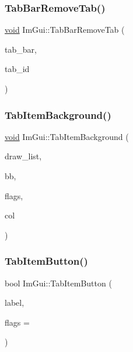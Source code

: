 \subsubsection{\texorpdfstring{Tab\+Bar\+Remove\+Tab()}{TabBarRemoveTab()}}
{\footnotesize\ttfamily \hyperlink{imgui__impl__opengl3__loader_8h_ac668e7cffd9e2e9cfee428b9b2f34fa7}{void} Im\+Gui\+::\+Tab\+Bar\+Remove\+Tab (\begin{DoxyParamCaption}\item[{\hyperlink{structImGuiTabBar}{Im\+Gui\+Tab\+Bar} $\ast$}]{tab\+\_\+bar,  }\item[{Im\+Gui\+ID}]{tab\+\_\+id }\end{DoxyParamCaption})}

\mbox{\label{namespaceImGui_a87fc45357f733cb2a378e098d2855243}} 
\subsubsection{\texorpdfstring{Tab\+Item\+Background()}{TabItemBackground()}}
{\footnotesize\ttfamily \hyperlink{imgui__impl__opengl3__loader_8h_ac668e7cffd9e2e9cfee428b9b2f34fa7}{void} Im\+Gui\+::\+Tab\+Item\+Background (\begin{DoxyParamCaption}\item[{\hyperlink{structImDrawList}{Im\+Draw\+List} $\ast$}]{draw\+\_\+list,  }\item[{const \hyperlink{structImRect}{Im\+Rect} \&}]{bb,  }\item[{Im\+Gui\+Tab\+Item\+Flags}]{flags,  }\item[{Im\+U32}]{col }\end{DoxyParamCaption})}

\mbox{\label{namespaceImGui_a1dbc539ac5b49e9445c4573607e6d60d}} 
\subsubsection{\texorpdfstring{Tab\+Item\+Button()}{TabItemButton()}}
{\footnotesize\ttfamily bool Im\+Gui\+::\+Tab\+Item\+Button (\begin{DoxyParamCaption}\item[{const char $\ast$}]{label,  }\item[{Im\+Gui\+Tab\+Item\+Flags}]{flags = {} }\end{DoxyParamCaption})}

